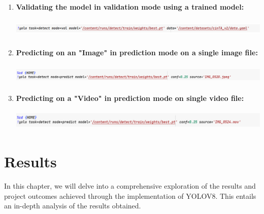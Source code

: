\documentclass[12 pt]{report}
\begin{document}
{\begin{enumerate}
    \item \textbf{Validating the model in validation mode using a trained model:}
          \begin{center}
            \includegraphics[width=17cm, height=1cm]{validating the yolomodel on the dataset.png}
          \end{center}

    \item \textbf{Predicting on an "Image" in prediction mode on a single image file:}
          \begin{center}
            \includegraphics[width=17cm, height=1cm]{Testing the model on real-world img.png}
          \end{center}

    \item \textbf{Predicting on a "Video" in prediction mode on single video file:}
          \begin{center}
            \includegraphics[width=17cm, height=1cm]{Testing the model on real-world video.png}
          \end{center}

  \end{enumerate}
 }

\newpage
\chapter{Results}
\justify
 {
  In this chapter, we will delve into a comprehensive exploration of the results and project outcomes achieved through the implementation of YOLOV8. This entails an in-depth analysis of the results obtained.
 }
\end{document}
